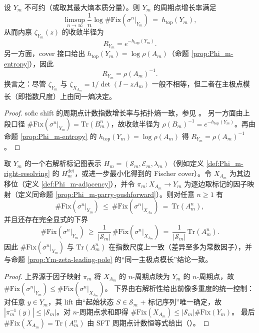 \begin{proposition}\label{prop:Ym-zeta-leading-pole}
设 \(Y_m\) 不可约（或取其最大熵本质分量）。则 \(Y_m\) 的周期点增长率满足
\[
\limsup_{n\to\infty}\frac{1}{n}\log\#\mathrm{Fix}(\sigma^n|_{Y_m})
\ =\ h_{\mathrm{top}}(Y_m),
\]
从而内禀 \(\zeta_{Y_m}(z)\) 的收敛半径为
\[
R_{Y_m}=e^{-h_{\mathrm{top}}(Y_m)}.
\]
另一方面，cover 接口给出 \(h_{\mathrm{top}}(Y_m)=\log\rho(A_m)\)（命题 \ref{prop:Phi_m-entropy}），因此
\[
R_{Y_m}=\rho(A_m)^{-1}.
\]
换言之：尽管 \(\zeta_{Y_m}\) 与 \(\zeta_{X_{A_m}}=1/\det(I-zA_m)\) 一般不相等，但二者在主极点模长（即指数尺度）上由同一熵决定。
\end{proposition}

\begin{proof}
sofic shift 的周期点计数指数增长率与拓扑熵一致，参见 \cite{Weiss1973SFTandSofic,CovenPaul1975SoficSystems,LindMarcus1995,Kitchens1998SymbolicDynamics}。
另一方面由上段口径 \(\#\mathrm{Fix}(\sigma^n|_{Y_m})=\mathrm{Tr}(B_m^n)\)，故收敛半径为 \(\rho(B_m)^{-1}=e^{-h_{\mathrm{top}}(Y_m)}\)。再由命题 \ref{prop:Phi_m-entropy} 的 \(h_{\mathrm{top}}(Y_m)=\log\rho(A_m)\) 得 \(R_{Y_m}=\rho(A_m)^{-1}\)。
\end{proof}

\begin{proposition}[周期点计数的显式夹逼：cover \texorpdfstring{$\Rightarrow$}{=>} sofic]\label{prop:periodic-count-sandwich}
取 \(Y_m\) 的一个右解析标记图表示 \(H_m=(\mathcal{S}_m,\mathcal{E}_m,\lambda_m)\)（例如定义 \ref{def:Phi_m-right-resolving} 的 \(H_m^{\mathrm{det}}\)，或进一步最小化得到的 Fischer cover）。令 \(X_{A_m}\) 为其边移位（定义 \ref{def:Phi_m-adjacency}），并令 \(\pi_m:X_{A_m}\to Y_m\) 为逐边取标记的因子映射（定义同命题 \ref{prop:Phi_m-parry-pushforward}）。则对任意 \(n\ge 1\) 有
\[
\#\mathrm{Fix}(\sigma^n|_{Y_m})
\ \le\
\#\mathrm{Fix}(\sigma^n|_{X_{A_m}})
\ =\
\mathrm{Tr}(A_m^n),
\]
并且还存在完全显式的下界
\[
\#\mathrm{Fix}(\sigma^n|_{Y_m})
\ \ge\
\frac{1}{|\mathcal{S}_m|}\,\#\mathrm{Fix}(\sigma^n|_{X_{A_m}})
\ =\
\frac{1}{|\mathcal{S}_m|}\,\mathrm{Tr}(A_m^n).
\]
因此 \(\#\mathrm{Fix}(\sigma^n|_{Y_m})\) 与 \(\mathrm{Tr}(A_m^n)\) 在指数尺度上一致（差异至多为常数因子），并与命题 \ref{prop:Ym-zeta-leading-pole} 的“同一主极点模长”结论一致。
\end{proposition}

\begin{proof}
上界源于因子映射 \(\pi_m\) 将 \(X_{A_m}\) 的 \(n\)-周期点映为 \(Y_m\) 的 \(n\)-周期点，故 \(\#\mathrm{Fix}(\sigma^n|_{Y_m})\le \#\mathrm{Fix}(\sigma^n|_{X_{A_m}})\)。
下界由右解析性给出前像多重度的统一控制：对任意 $y\in Y_m$，其 lift 由“起始状态 $S\in\mathcal{S}_m$ + 标记序列”唯一确定，故 $|\pi_m^{-1}(y)|\le |\mathcal{S}_m|$。对 $n$-周期点求和即得
\(\#\mathrm{Fix}(X_{A_m})\le |\mathcal{S}_m|\#\mathrm{Fix}(Y_m)\)。
最后 \(\#\mathrm{Fix}(X_{A_m})=\mathrm{Tr}(A_m^n)\) 由 SFT 周期点计数恒等式给出（\cite{LindMarcus1995}）。
\end{proof}

